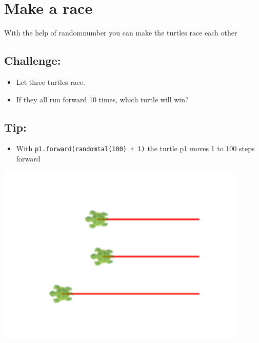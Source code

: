 \chapter{Make a race}
\begin{multicols}{2}
With the help of randomnumber you can make the turtles race each other
\section*{\color{BrickRed}Challenge:}


\begin{itemize}

\item {Let three turtles race.}
\item {If they all run forward 10 times, which turtle will win?}

\end{itemize}


\section*{\color{OliveGreen}Tip:}


\begin{itemize}

\item {With \lstinline{p1.forward(randomtal(100) + 1)} the turtle p1 moves 1 to 100 steps forward}

\end{itemize}



\columnbreak

\begin{center}
\includegraphics[width=12.0cm]{../img/race.png}
\end{center}

\end{multicols}

